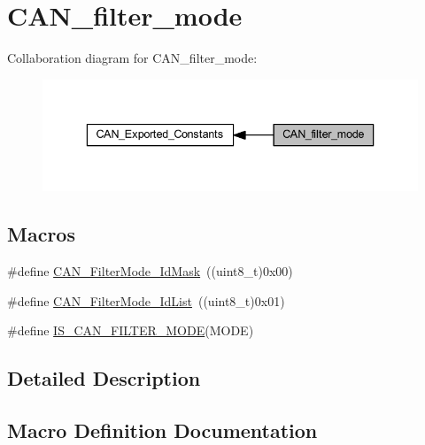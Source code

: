 \hypertarget{group___c_a_n__filter__mode}{}\section{C\+A\+N\+\_\+filter\+\_\+mode}
\label{group___c_a_n__filter__mode}
Collaboration diagram for C\+A\+N\+\_\+filter\+\_\+mode\+:
\nopagebreak
\begin{figure}[H]
\begin{center}
\leavevmode
\includegraphics[width=336pt]{group___c_a_n__filter__mode}
\end{center}
\end{figure}
\subsection*{Macros}
\begin{DoxyCompactItemize}
\item 
\#define \hyperlink{group___c_a_n__filter__mode_ga8136e518fb31fd91079e4c7c4c19c94b}{C\+A\+N\+\_\+\+Filter\+Mode\+\_\+\+Id\+Mask}~((uint8\+\_\+t)0x00)
\item 
\#define \hyperlink{group___c_a_n__filter__mode_ga91e9144f71b15ac345ee89314711c158}{C\+A\+N\+\_\+\+Filter\+Mode\+\_\+\+Id\+List}~((uint8\+\_\+t)0x01)
\item 
\#define \hyperlink{group___c_a_n__filter__mode_gae684565d5392c12fd333379e5ec840f8}{I\+S\+\_\+\+C\+A\+N\+\_\+\+F\+I\+L\+T\+E\+R\+\_\+\+M\+O\+DE}(M\+O\+DE)
\end{DoxyCompactItemize}


\subsection{Detailed Description}


\subsection{Macro Definition Documentation}
\mbox{\label{group___c_a_n__filter__mode_ga91e9144f71b15ac345ee89314711c158}} 
